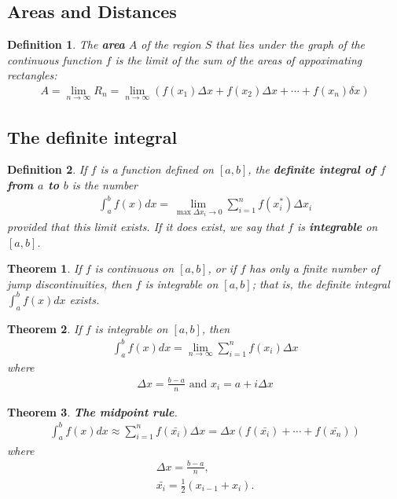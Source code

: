 \documentclass{article}
\theoremstyle{sltheorem}
\newtheorem{definition}{Definition}[section]
\newtheorem{theorem}{Theorem}[section]
\begin{document}
\subsection{Areas and Distances}
\begin{definition}
  The \textbf{area} $A$ of the region $S$ that lies under the graph of the continuous function $f$ is the limit of the sum of the areas of appoximating rectangles:
  \begin{align*}
      A=\lim_{n\to\infty}R_n = \lim_{n\to \infty}\left(f(x_1)\Delta x + f(x_2)\Delta x + \cdots + f(x_n)\delta x\right)
  \end{align*}
\end{definition}
\subsection{The definite integral}
\begin{definition}
    If $f$ is a function defined on $[a,b]$, the \textbf{definite integral of $f$ from $a$ to $b$} is the number
    \begin{align*}
        \int_a^b f(x)dx=\lim_{\max \Delta x_i\to0}\sum_{i=1}^n f(x_i^*)\Delta x_i
    \end{align*}
    provided that this limit exists. If it does exist, we say that $f$ is \textbf{integrable} on $[a,b]$.
\end{definition}
\begin{theorem}
    If $f$ is continuous on $[a,b]$, or if $f$ has only a finite number of jump discontinuities, then $f$ is integrable on $[a,b]$; that is, the definite integral $\int_a^b f(x)dx$ exists.
\end{theorem}
\begin{theorem}
    If $f$ is integrable on $[a,b]$, then \begin{align*}
        \int_a^b f(x)dx = \lim_{n\to\infty}\sum_{i=1}^nf(x_i)\Delta x
    \end{align*}
    where \begin{align*}
    \Delta x = \frac{b-a}{n} \text{ and } x_i=a+i\Delta x
    \end{align*}
\end{theorem}
\begin{theorem}
    \textbf{The midpoint rule}.
    \begin{align*}
        \int_a^bf(x)dx \approx \sum_{i=1}^nf(\bar{x_i})\Delta x = \Delta x (f(\bar{x_i})+\cdots+f(\bar{x_n}))
    \end{align*}
    where
    \begin{align*}
        \Delta x = \frac{b-a}{n},\\
        \bar{x_i} = \frac{1}{2}(x_{i-1}+x_i).
    \end{align*}
\end{theorem}
\end{document}
